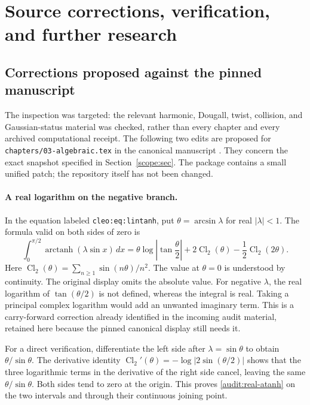 \documentclass[11pt,a4paper]{article}
\numberwithin{equation}{section}
\theoremstyle{definition}
\theoremstyle{remark}
\newcommand{\src}[1]{\nolinkurl{#1}}
\begin{document}
\clearpage
\section{Source corrections, verification, and further research}
\label{audit:sec}

\subsection{Corrections proposed against the pinned manuscript}

The inspection was targeted: the relevant harmonic, Dougall, twist,
collision, and Gaussian-status material was checked, rather than every
chapter and every archived computational receipt. The following two
edits are proposed for \src{chapters/03-algebraic.tex} in the
canonical manuscript \cite{RepoMain}. They concern the exact snapshot
specified in Section~\ref{scope:sec}. The package contains a small
unified patch; the repository itself has not been changed.

\paragraph{A real logarithm on the negative branch.}
In the equation labeled \src{cleo:eq:lintanh}, put
$\theta=\arcsin\lambda$ for real $|\lambda|<1$. The formula valid
on both sides of zero is
\begin{equation}\label{audit:real-atanh}
 \int_0^{\pi/2}\operatorname{arctanh}(\lambda\sin x)\,dx
 =\theta\log\left|\tan\frac\theta2\right|
       +2\operatorname{Cl}_2(\theta)
       -\frac12\operatorname{Cl}_2(2\theta).
\end{equation}
Here $\operatorname{Cl}_2(\theta)=\sum_{n\ge1}\sin(n\theta)/n^2$.
The value at $\theta=0$ is understood by continuity. The original
display omits the absolute value. For negative $\lambda$, the
real logarithm of $\tan(\theta/2)$ is not defined, whereas the
integral is real. Taking a principal complex logarithm would add
an unwanted imaginary term. This is a carry-forward correction
already identified in the incoming audit material, retained here
because the pinned canonical display still needs it.

For a direct verification, differentiate the left side after
$\lambda=\sin\theta$ to obtain $\theta/\sin\theta$.
The derivative identity
$\operatorname{Cl}_2'(\theta)=-\log|2\sin(\theta/2)|$
shows that the three logarithmic terms in the derivative of the
right side cancel, leaving the same $\theta/\sin\theta$.
Both sides tend to zero at the origin. This proves
\eqref{audit:real-atanh} on the two intervals and through their
continuous joining point.
\end{document}
